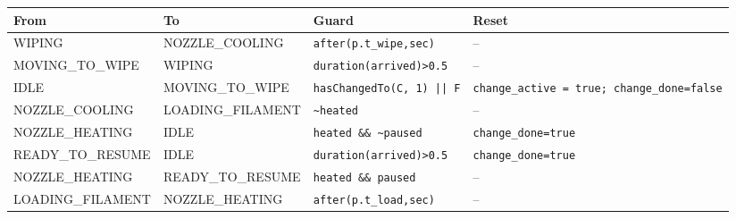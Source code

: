 \begin{tabular}{@{}llp{}p{}@{}}
\toprule
From & To & Guard & Reset \\
\midrule
WIPING & NOZZLE\_COOLING & \texttt{after(p.t\_wipe,sec)} & -- \\
MOVING\_TO\_WIPE & WIPING & \texttt{duration(arrived)>0.5} & -- \\
IDLE & MOVING\_TO\_WIPE & \texttt{hasChangedTo(C, 1) || F} & \texttt{change\_active = true; change\_done=false} \\
NOZZLE\_COOLING & LOADING\_FILAMENT & \texttt{\textasciitilde{}heated} & -- \\
NOZZLE\_HEATING & IDLE & \texttt{heated \&\& \textasciitilde{}paused} & \texttt{change\_done=true} \\
READY\_TO\_RESUME & IDLE & \texttt{duration(arrived)>0.5} & \texttt{change\_done=true} \\
NOZZLE\_HEATING & READY\_TO\_RESUME & \texttt{heated \&\& paused} & -- \\
LOADING\_FILAMENT & NOZZLE\_HEATING & \texttt{after(p.t\_load,sec)} & -- \\
\bottomrule
\end{tabular}
